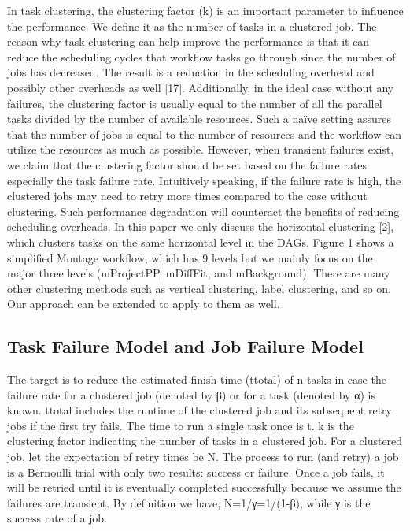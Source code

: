 \documentclass{IOS-Book-Article}
\begin{document}
In task clustering, the clustering factor (k) is an important parameter to influence the performance. We define it as the number of tasks in a clustered job. The reason why task clustering can help improve the performance is that it can reduce the scheduling cycles that workflow tasks go through since the number of jobs has decreased. The result is a reduction in the scheduling overhead and possibly other overheads as well [17]. Additionally, in the ideal case without any failures, the clustering factor is usually equal to the number of all the parallel tasks divided by the number of available resources. Such a naïve setting assures that the number of jobs is equal to the number of resources and the workflow can utilize the resources as much as possible. However, when transient failures exist, we claim that the clustering factor should be set based on the failure rates especially the task failure rate. Intuitively speaking, if the failure rate is high, the clustered jobs may need to retry more times compared to the case without clustering. Such performance degradation will counteract the benefits of reducing scheduling overheads. 
In this paper we only discuss the horizontal clustering [2], which clusters tasks on the same horizontal level in the DAGs. Figure 1 shows a simplified Montage workflow, which has 9 levels but we mainly focus on the major three levels (mProjectPP, mDiffFit, and mBackground). There are many other clustering methods such as vertical clustering, label clustering, and so on. Our approach can be extended to apply to them as well. 

\subsection{Task Failure Model and Job Failure Model}

 The target is to reduce the estimated finish time (ttotal) of n tasks in case the failure rate for a clustered job (denoted by β) or for a task (denoted by α) is known. ttotal includes the runtime of the clustered job and its subsequent retry jobs if the first try fails. The time to run a single task once is t. k is the clustering factor indicating the number of tasks in a clustered job. For a clustered job, let the expectation of retry times be N. The process to run (and retry) a job is a Bernoulli trial with only two results: success or failure. Once a job fails, it will be retried until it is eventually completed successfully because we assume the failures are transient. By definition we have, N=1/γ=1/(1-β), while γ is the success rate of a job.
\end{document}
